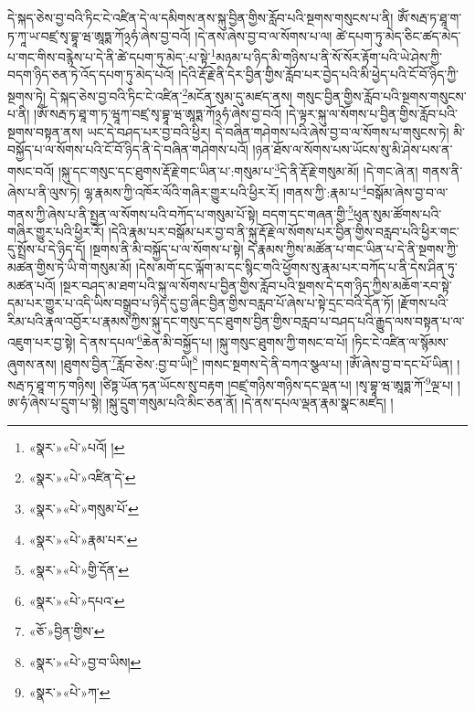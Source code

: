 དེ་སྐད་ཅེས་བྱ་བའི་ཏིང་ངེ་འཛིན་དེ་ལ་དམིགས་ནས་སྐུ་བྱིན་གྱིས་རློབ་པའི་སྔགས་གསུངས་པ་ནི། ཨོཾ་སརྦ་ཏ་ཐཱ་ག་ཏ་ཀཱ་ཡ་བཛྲ་སྭ་བྷཱ་ཝ་ཨཱཏྨ་ཀོ྅ཧཾ་ཞེས་བྱ་བའོ། །དེ་ནས་ཞེས་བྱ་བ་ལ་སོགས་པ་ལ། ཚེ་དཔག་ཏུ་མེད་ཅིང་ཚད་མེད་པ་གང་གིས་བརྙེས་པ་དེ་ནི་ཚེ་དཔག་ཏུ་མེད་:པ་སྟེ་\footnote{«སྣར་»«པེ་»པའོ། །}མཉམ་པ་ཉིད་མི་གཉིས་པ་ནི་སོ་སོར་རྟོག་པའི་ཡེ་ཤེས་ཀྱི་བདག་ཉིད་ཅན་ཏེ་འོད་དཔག་ཏུ་མེད་པའོ། །དེའི་རྡོ་རྗེ་ནི་དེར་བྱིན་གྱིས་རློབ་པར་བྱེད་པའི་མི་ཕྱེད་པའི་ངོ་བོ་ཉིད་ཀྱི་སྔགས་ཏེ། དེ་སྐད་ཅེས་བྱ་བའི་ཏིང་ངེ་འཛིན་\footnote{«སྣར་»«པེ་»འཛིན་དེ་}མངོན་སུམ་དུ་མཛད་ནས། གསུང་བྱིན་གྱིས་རློབ་པའི་སྔགས་གསུངས་པ་ནི། །ཨོཾ་སརྦ་ཏ་ཐཱ་ག་ཏ་ཝཱཀ་བཛྲ་སྭ་བྷཱ་ཝ་ཨཱཏྨ་ཀོ྅ཧཾ་ཞེས་བྱ་བའོ། །དེ་ལྟར་སྐུ་ལ་སོགས་པ་བྱིན་གྱིས་རློབ་པའི་སྔགས་བསྟན་ནས། ཡང་དེ་བཤད་པར་བྱ་བའི་ཕྱིར། དེ་བཞིན་གཤེགས་པའི་ཞེས་བྱ་བ་ལ་སོགས་པ་གསུངས་ཏེ། མི་བསྐྱོད་པ་ལ་སོགས་པའི་ངོ་བོ་ཉིད་ནི་དེ་བཞིན་གཤེགས་པའོ། །ཉན་ཐོས་ལ་སོགས་པས་ཡོངས་སུ་མི་ཤེས་པས་ན་གསང་བའོ། །སྐུ་དང་གསུང་དང་ཐུགས་རྡོ་རྗེ་གང་ཡིན་པ་:གསུམ་པ་\footnote{«སྣར་»«པེ་»གསུམ་པོ་}དེ་ནི་རྡོ་རྗེ་གསུམ་མོ། །དེ་གང་ཞེ་ན། གནས་ནི་ཞེས་པ་ནི་ལུས་ཏེ། ལྷ་རྣམས་ཀྱི་འཁོར་ལོའི་གཞིར་གྱུར་པའི་ཕྱིར་རོ། །གནས་ཀྱི་:རྣམ་པ་\footnote{«སྣར་»«པེ་»རྣམ་པར་}བསྒོམ་ཞེས་བྱ་བ་ལ་གནས་ཀྱི་ཞེས་པ་ནི་སྤྱན་ལ་སོགས་པའི་བཀོད་པ་གསུམ་པོ་སྟེ། བདག་དང་གཞན་གྱི་\footnote{«སྣར་»«པེ་»གྱི་དོན་}ཕུན་སུམ་ཚོགས་པའི་གཞིར་གྱུར་པའི་ཕྱིར་རོ། །དེའི་རྣམ་པར་བསྒོམ་པར་བྱ་བ་ནི་སྐུ་རྡོ་རྗེ་ལ་སོགས་པར་བྱིན་གྱིས་བརླབ་པའི་ཕྱིར་གང་དུ་སྤྲོས་པ་དེ་ཉིད་དོ། །སྔགས་ནི་མི་བསྐྱོད་པ་ལ་སོགས་པ་སྟེ། དེ་རྣམས་ཀྱིས་མཚོན་པ་གང་ཡིན་པ་དེ་ནི་སྔགས་ཀྱི་མཚན་གྱིས་ཏེ་ཡི་གེ་གསུམ་མོ། །དེས་མགོ་དང་ལྐོག་མ་དང་སྙིང་གའི་ཕྱོགས་སུ་རྣམ་པར་བཀོད་པ་ནི་དེས་ཤིན་ཏུ་མཚན་པའོ། །སྔར་བཤད་མ་ཐག་པའི་སྐུ་ལ་སོགས་པ་བྱིན་གྱིས་རློབ་པའི་སྔགས་དེ་དག་ཉིད་ཀྱིས་མཆོག་རབ་སྟེ་དམ་པར་གྱུར་པ་འདི་ཡིས་བསྒྲུབ་པ་ཉིད་དུ་བྱ་ཞིང་བྱིན་གྱིས་བརླབ་པོ་ཞེས་པ་སྟེ་དྲང་བའི་དོན་ཏོ། །རྫོགས་པའི་རིམ་པའི་རྣལ་འབྱོར་པ་རྣམས་ཀྱིས་སྐུ་དང་གསུང་དང་ཐུགས་བྱིན་གྱིས་བརླབ་པ་བཤད་པའི་རྒྱུད་ལས་བསྟན་པ་ལ་འཇུག་པར་བྱ་སྟེ། དེ་ནས་དཔལ་\footnote{«སྣར་»«པེ་»དཔའ་}ཆེན་མི་བསྐྱོད་པ། །སྐུ་གསུང་ཐུགས་ཀྱི་གསང་བ་པོ། །ཏིང་ངེ་འཛིན་ལ་སྙོམས་ཞུགས་ནས། །ཐུགས་བྱིན་\footnote{«ཅོ་»བྱིན་གྱིས་}རློབ་ཅེས་:བྱ་བ་ཡི།\footnote{«སྣར་»«པེ་»བྱ་བ་ཡིས།} །གསང་སྔགས་དེ་ནི་བཀའ་སྩལ་པ། །ཨོཾ་ཞེས་བྱ་བ་དང་པོ་ཡིན། །སརྦ་ཏ་ཐཱ་ག་ཏ་གཉིས། །ཙིཏྟ་ཡོན་ཏན་ཡོངས་སུ་བརྟག །བཛྲ་གཉིས་གཉིས་དང་ལྡན་པ། །སྭ་བྷཱ་ཝ་ཨཱཏྨ་ཀོ་\footnote{«སྣར་»«པེ་»ཀ་}ལྔ་པ། །ཨ་ཧཾ་ཞེས་པ་དྲུག་པ་སྟེ། །སྐུ་དྲུག་གསུམ་པའི་མིང་ཅན་ནོ། །དེ་ནས་དཔལ་ལྡན་རྣམ་སྣང་མཛད། །

